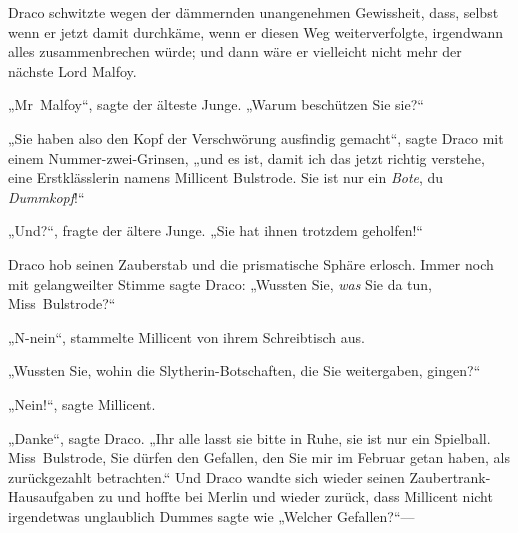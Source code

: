 Draco schwitzte wegen der dämmernden unangenehmen Gewissheit, dass, selbst wenn er jetzt damit durchkäme, wenn er diesen Weg weiterverfolgte, irgendwann alles zusammenbrechen würde; und dann wäre er vielleicht nicht mehr der nächste Lord Malfoy.

„Mr~Malfoy“, sagte der älteste Junge. „Warum beschützen Sie sie?“

„Sie haben also den Kopf der Verschwörung ausfindig gemacht“, sagte Draco mit einem Nummer-zwei-Grinsen, „und es ist, damit ich das jetzt richtig verstehe, eine Erstklässlerin namens Millicent Bulstrode. Sie ist nur ein \emph{Bote}, du \emph{Dummkopf}!“

„Und?“, fragte der ältere Junge. „Sie hat ihnen trotzdem geholfen!“

Draco hob seinen Zauberstab und die prismatische Sphäre erlosch. Immer noch mit gelangweilter Stimme sagte Draco: „Wussten Sie, \emph{was} Sie da tun, Miss~Bulstrode?“

„N-nein“, stammelte Millicent von ihrem Schreibtisch aus.

„Wussten Sie, wohin die Slytherin-Botschaften, die Sie weitergaben, gingen?“

„Nein!“, sagte Millicent.

„Danke“, sagte Draco. „Ihr alle lasst sie bitte in Ruhe, sie ist nur ein Spielball. Miss~Bulstrode, Sie dürfen den Gefallen, den Sie mir im Februar getan haben, als zurückgezahlt betrachten.“ Und Draco wandte sich wieder seinen Zaubertrank-Hausaufgaben zu und hoffte bei Merlin und wieder zurück, dass Millicent nicht irgendetwas unglaublich Dummes sagte wie „Welcher Gefallen?“—

